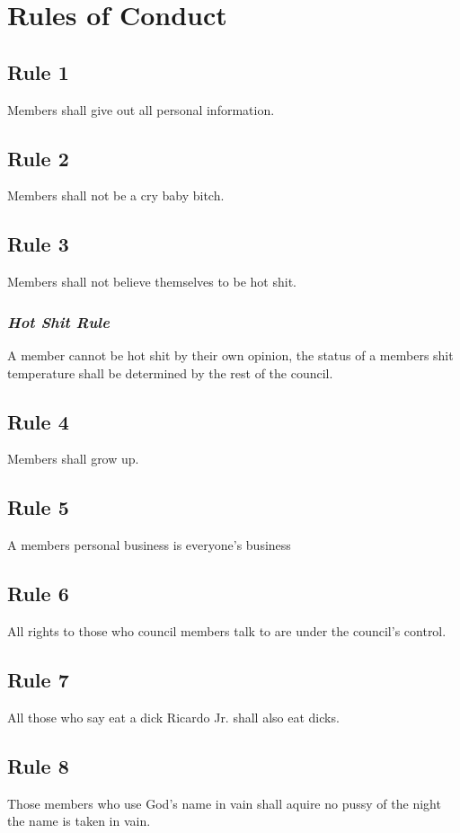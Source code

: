 \documentclass[]{article}
\begin{document}
\newpage
\section{Rules of Conduct}
\label{sec:rulesConduct}

\subsection{Rule 1}
Members shall give out all personal information.

\subsection{Rule 2}
Members shall not be a cry baby bitch.

\subsection{Rule 3}
Members shall not believe themselves to be hot shit.
\subsubsection{\textit{Hot Shit Rule}}
A member cannot be hot shit by their own opinion, the status of a members shit temperature shall be determined by the rest of the council.

\subsection{Rule 4}
Members shall grow up.

\subsection{Rule 5}
A members personal business is everyone's business

\subsection{Rule 6}
All rights to those who council members talk to are under the council's control.

\subsection{Rule 7}
All those who say eat a dick Ricardo Jr. shall also eat dicks.

\subsection{Rule 8}
Those members who use God's name in vain shall aquire no pussy of the night the name is taken in vain.
\end{document}
